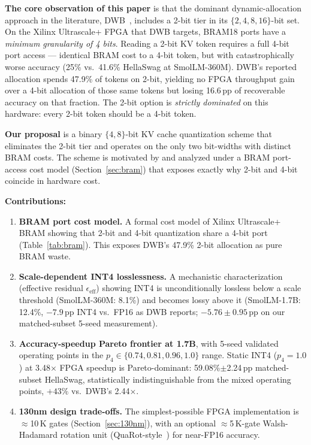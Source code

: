 \documentclass{article}
\begin{document}
\textbf{The core observation of this paper} is that the dominant dynamic-allocation approach in the literature, DWB~\citep{haeri2026dwb}, includes a 2-bit tier in its $\{2,4,8,16\}$-bit set. On the Xilinx Ultrascale+ FPGA that DWB targets, BRAM18 ports have a \emph{minimum granularity of 4 bits}. Reading a 2-bit KV token requires a full 4-bit port access --- identical BRAM cost to a 4-bit token, but with catastrophically worse accuracy (25\% vs.\ 41.6\% HellaSwag at SmolLM-360M). DWB's reported allocation spends 47.9\% of tokens on 2-bit, yielding no FPGA throughput gain over a 4-bit allocation of those same tokens but losing 16.6\,pp of recoverable accuracy on that fraction. The 2-bit option is \emph{strictly dominated} on this hardware: every 2-bit token should be a 4-bit token.

\textbf{Our proposal} is a binary $\{4, 8\}$-bit KV cache quantization scheme that eliminates the 2-bit tier and operates on the only two bit-widths with distinct BRAM costs. The scheme is motivated by and analyzed under a BRAM port-access cost model (Section~\ref{sec:bram}) that exposes exactly why 2-bit and 4-bit coincide in hardware cost.

\textbf{Contributions:}

\begin{enumerate}
\item \textbf{BRAM port cost model.} A formal cost model of Xilinx Ultrascale+ BRAM showing that 2-bit and 4-bit quantization share a 4-bit port (Table~\ref{tab:bram}). This exposes DWB's 47.9\% 2-bit allocation as pure BRAM waste.

\item \textbf{Scale-dependent INT4 losslessness.} A mechanistic characterization (effective residual $\epsilon_\text{eff}$) showing INT4 is unconditionally lossless below a scale threshold (SmolLM-360M: 8.1\%) and becomes lossy above it (SmolLM-1.7B: 12.4\%, $-7.9$\,pp INT4 vs.\ FP16 as DWB reports; $-5.76\pm0.95$\,pp on our matched-subset 5-seed measurement).

\item \textbf{Accuracy-speedup Pareto frontier at 1.7B}, with 5-seed validated operating points in the $p_4 \in \{0.74, 0.81, 0.96, 1.0\}$ range. Static INT4 ($p_4=1.0$) at 3.48$\times$ FPGA speedup is Pareto-dominant: 59.08\%$\pm$2.24\,pp matched-subset HellaSwag, statistically indistinguishable from the mixed operating points, $+43\%$ vs.\ DWB's 2.44$\times$.

\item \textbf{130nm design trade-offs.} The simplest-possible FPGA implementation is $\approx$10\,K gates (Section~\ref{sec:130nm}), with an optional $\approx$5\,K-gate Walsh-Hadamard rotation unit (QuaRot-style~\citep{ashkboos2024quarot}) for near-FP16 accuracy.
\end{enumerate}
\end{document}
